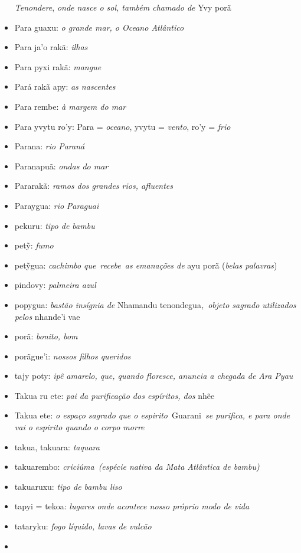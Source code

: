 \begin{itemize}
  \emph{Tenondere}, \emph{onde nasce o sol, também chamado de} Yvy porã
\item
  Para guaxu: \emph{o grande mar, o Oceano Atlântico}
\item
  Para ja'o rakã: \emph{ilhas}
\item
  Para pyxi rakã: \emph{mangue}
\item
  Pará rakã apy: \emph{as nascentes}
\item
  Para rembe: \emph{à margem do mar}
\item
  Para yvytu ro'y: Para = \emph{oceano}, yvytu = \emph{vento}, ro'y =
  \emph{frio}
\item
  Parana: \emph{rio Paraná}
\item
  Paranapuã: \emph{ondas do mar}
\item
  Pararakã: \emph{ramos dos grandes rios, afluentes}
\item
  Paraygua: \emph{rio} \emph{Paraguai}
\item
  pekuru: \emph{tipo de bambu}
\item
  petỹ: \emph{fumo}
\item
  petỹgua: \emph{cachimbo que}~\emph{recebe}~\emph{as emanações de} ayu
  porã (\emph{belas palavras})
\item
  pindovy: \emph{palmeira azul}
\item
  popygua: \emph{bastão insígnia de} Nhamandu
  tenondegua\emph{,}~\emph{objeto sagrado utilizados pelos} nhande'i vae
\item
  porã: \emph{bonito, bom}
\item
  porãgue'i: \emph{nossos filhos queridos}
\item
  tajy poty: \emph{ipê amarelo, que, quando floresce, anuncia a chegada
  de Ara Pyau}
\item
  Takua ru ete: \emph{pai da purificação dos espíritos, dos} nhẽe
\item
  Takua ete: \emph{o espaço sagrado que o espirito}~Guarani~\emph{se
  purifica, e para onde vai o espirito quando o corpo morre}
\item
  takua, takuara: \emph{taquara}
\item
  takuarembo: \emph{criciúma}~\emph{(espécie nativa da Mata Atlântica de
  bambu)}
\item
  takuaruxu: \emph{tipo de bambu liso}
\item
  tapyi = tekoa: \emph{lugares onde acontece nosso próprio modo de vida}
\item
  tataryku: \emph{fogo líquido, lavas de vulcão}
\item

\end{itemize}
